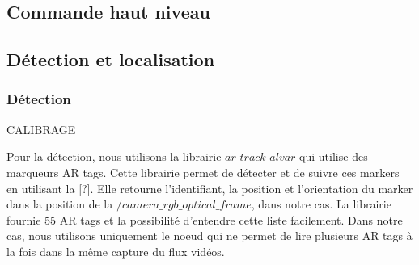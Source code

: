 \documentclass[10pt,a4paper]{article}
\begin{document}
\subsection{Commande haut niveau}
\label{sec:commande_haut_niveau}

\subsection{Détection et localisation}
\label{sec:detection_et_localisation}




\subsubsection{Détection}
\label{sec:detection}

CALIBRAGE 

Pour la détection, nous utilisons la librairie $ar\_track\_alvar$ qui utilise des marqueurs AR tags.   
Cette librairie permet de détecter et de suivre ces markers en utilisant la [?]. Elle retourne l'identifiant, la position et l'orientation du marker dans la position de la $/camera\_rgb\_optical\_frame$, dans notre cas. La librairie fournie 55 AR tags et la possibilité d'entendre cette liste facilement. Dans notre cas, nous utilisons uniquement le noeud qui ne permet de lire plusieurs AR tags à la fois dans la même capture du flux vidéos. 
\end{document}

